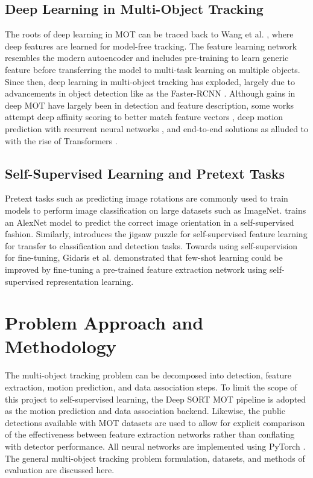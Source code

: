 \documentclass[10pt,twocolumn,letterpaper]{article}
\begin{document}
\subsection{Deep Learning in Multi-Object Tracking}
The roots of deep learning in MOT can be traced back to Wang et al. \cite{Wang2014Mot}, where deep features are learned for model-free tracking. The feature learning network resembles the modern autoencoder and includes pre-training to learn generic feature before transferring the model to multi-task learning on multiple objects. Since then, deep learning in multi-object tracking has exploded, largely due to advancements in object detection like as the Faster-RCNN \cite{FasterRCNN}. Although gains in deep MOT have largely been in detection and feature description, some works attempt deep affinity scoring to better match feature vectors \cite{DeepAffinity}, deep motion prediction with recurrent neural networks \cite{MotionPred}, and end-to-end solutions as alluded to with the rise of Transformers \cite{Meinhardt2021}.

\subsection{Self-Supervised Learning and Pretext Tasks}
Pretext tasks such as predicting image rotations are commonly used to train models to perform image classification on large datasets such as ImageNet. \cite{gidaris2018unsupervised} trains an AlexNet model to predict the correct image orientation in a self-supervised fashion. Similarly, \cite{PuzzleTask} introduces the jigsaw puzzle for self-supervised feature learning for transfer to classification and detection tasks. Towards using self-supervision for fine-tuning, Gidaris et al. \cite{Gidaris2019} demonstrated that few-shot learning could be improved by fine-tuning a pre-trained feature extraction network using self-supervised representation learning.

\section{Problem Approach and Methodology}
The multi-object tracking problem can be decomposed into detection, feature extraction, motion prediction, and data association steps. To limit the scope of this project to self-supervised learning, the Deep SORT MOT pipeline \cite{Wojke2018} is adopted as the motion prediction and data association backend. Likewise, the public detections available with MOT datasets are used to allow for explicit comparison of the effectiveness between feature extraction networks rather than conflating with detector performance. All neural networks are implemented using PyTorch \cite{PyTorch}. The general multi-object tracking problem formulation, datasets, and methods of evaluation are discussed here.
\end{document}
